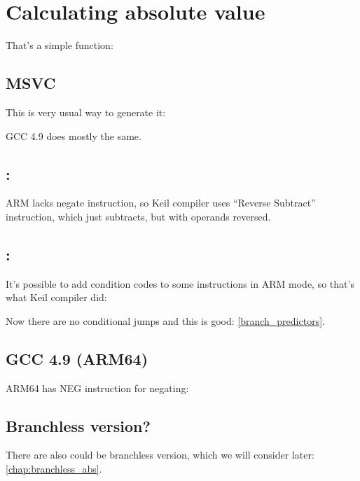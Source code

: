 ﻿\ifx\RUSSIAN\undefined
\section{Calculating absolute value}
\label{sec:abs}

That's a simple function:



\subsection{\Optimizing MSVC}

This is very usual way to generate it:



GCC 4.9 does mostly the same.

\subsection{\OptimizingKeilVI: \ThumbMode}



ARM lacks negate instruction, so Keil compiler uses ``Reverse Subtract'' instruction, which just subtracts,
but with operands reversed.

\subsection{\OptimizingKeilVI: \ARMMode}

It's possible to add condition codes to some instructions in ARM mode, so that's what Keil compiler did:



Now there are no conditional jumps and this is good: \ref{branch_predictors}.

\subsection{\NonOptimizing GCC 4.9 (ARM64)}

ARM64 has NEG instruction for negating:



\subsection{Branchless version?}

There are also could be branchless version, which we will consider later: \ref{chap:branchless_abs}.

\fi

